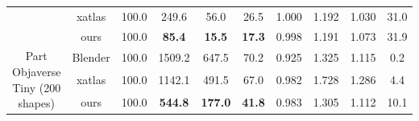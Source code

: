 \begin{table}[t]
\begin{tabular}{c|c|cccccccc}
          & xatlas & 100.0 & 249.6 & 56.0  & 26.5  & 1.000 & 1.192 & 1.030 & 31.0 \\
          & ours  & 100.0 & \textbf{85.4} & \textbf{15.5} & \textbf{17.3} & 0.998 & 1.191 & 1.073 & 31.9 \\
    \midrule
     \multicolumn{1}{c|}{\multirow{3}[0]{*}{\parbox{1.5cm}{\centering Part\\Objaverse\\Tiny (200 shapes)}}} 
          & Blender & 100.0 & 1509.2 & 647.5 & 70.2  & 0.925 & 1.325 & 1.115 & 0.2 \\
          & xatlas & 100.0 & 1142.1 & 491.5 & 67.0  & 0.982 & 1.728 & 1.286 & 4.4 \\
          & ours  & 100.0 & \textbf{544.8} & \textbf{177.0} & \textbf{41.8} & 0.983 & 1.305 & 1.112 & 10.1 \\
    \bottomrule
    \end{tabular}%
  \label{tab:blender_and_xatlas}
\vspace{-1em}
\end{table}%


